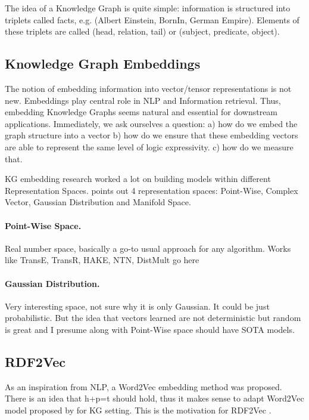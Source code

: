 \documentclass[a4paper,oneside,bibliography=totoc]{scrartcl}
\begin{document}
The idea of a Knowledge Graph is quite simple: information is structured into triplets called facts, 
e.g. (Albert Einstein, BornIn, German Empire). Elements of these triplets are called (head, relation, tail) or (subject, predicate, object).






\subsection{Knowledge Graph Embeddings}
The notion of embedding information into vector/tensor representations is not new. 
Embeddings play central role in NLP and Information retrieval. 
Thus, embedding Knowledge Graphs seems natural and essential for downstream applications. 
Immediately, we ask ourselves a question:
a) how do we embed the graph structure into a vector
b) how do we ensure that these embedding vectors are able to represent the same level of logic expressivity.
c) how do we measure that. 


KG embedding research worked a lot on building models within different Representation Spaces.
\cite{ji_survey_2022} points out 4 representation spaces: Point-Wise, Complex Vector, Gaussian Distribution and Manifold Space.
\paragraph{Point-Wise Space.} Real number space, basically a go-to usual approach for any algorithm. 
Works like TransE, TransR, HAKE, NTN, DistMult go here

\paragraph{Gaussian Distribution.} Very interesting space, not sure why it is only Gaussian. 
It could be just probabilistic. But the idea that vectors learned are not deterministic but random is great
and I presume along with Point-Wise space should have SOTA models. 


\subsection{RDF2Vec}
As an inspiration from NLP, a Word2Vec embedding method was proposed. There is an idea that h+p=t should hold, thus it makes sense to adapt Word2Vec model proposed by \cite{mikolov_efficient_2013} for KG setting.
This is the motivation for RDF2Vec \cite{groth_rdf2vec_2016}. 
\end{document}
